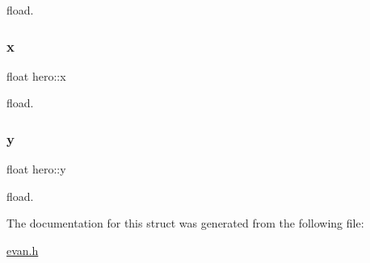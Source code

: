 fload. \mbox{\label{structhero_a26083549c9ec31f32cedef617ab76c8e}} 
\subsubsection{\texorpdfstring{x}{x}}
{\footnotesize\ttfamily float hero\+::x}

fload. \mbox{\label{structhero_a0cfaf220a87419e9488fd84213340d03}} 
\subsubsection{\texorpdfstring{y}{y}}
{\footnotesize\ttfamily float hero\+::y}

fload. 

The documentation for this struct was generated from the following file\+:\begin{DoxyCompactItemize}
\item 
\hyperlink{evan_8h}{evan.\+h}\end{DoxyCompactItemize}
